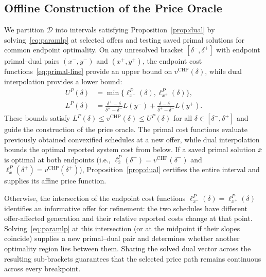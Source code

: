\documentclass[journal]{IEEEtran}
\newcommand{\CHP}{\mathrm{CHP}}
\begin{document}
\subsection{Offline Construction of the Price Oracle}
We partition $\mathcal{D}$ into intervals satisfying Proposition~\ref{prop:dual} by solving~\eqref{eq:paramlp} at selected offers and testing saved primal solutions for common endpoint optimality. On any unresolved bracket $[\delta^-,\delta^+]$ with endpoint primal--dual pairs $(x^-,y^-)$ and $(x^+,y^+)$, the endpoint cost functions~\eqref{eq:primal-line} provide an upper bound on $v^{\CHP}(\delta)$, while dual interpolation provides a lower bound:
\begin{align}
U^P(\delta) &= \min\{\ell_{x^-}^P(\delta),\ell_{x^+}^P(\delta)\},\label{eq:pricing-upper}\\
L^P(\delta) &= \frac{\delta^+-\delta}{\delta^+-\delta^-}L(y^-) + \frac{\delta-\delta^-}{\delta^+-\delta^-}L(y^+).\label{eq:pricing-lower}
\end{align}
These bounds satisfy $L^P(\delta)\le v^{\CHP}(\delta)\le U^P(\delta)$ for all $\delta\in[\delta^-,\delta^+]$ and guide the construction of the price oracle. The primal cost functions evaluate previously obtained convexified schedules at a new offer, while dual interpolation bounds the optimal reported system cost from below. If a saved primal solution $\bar{x}$ is optimal at both endpoints (i.e., $\ell_{\bar{x}}^P(\delta^-)=v^{\CHP}(\delta^-)$ and $\ell_{\bar{x}}^P(\delta^+)=v^{\CHP}(\delta^+)$), Proposition~\ref{prop:dual} certifies the entire interval and supplies its affine price function.

Otherwise, the intersection of the endpoint cost functions $\ell_{x^-}^P(\delta)=\ell_{x^+}^P(\delta)$ identifies an informative offer for refinement: the two schedules have different offer-affected generation and their relative reported costs change at that point. Solving~\eqref{eq:paramlp} at this intersection (or at the midpoint if their slopes coincide) supplies a new primal--dual pair and determines whether another optimality region lies between them. Sharing the solved dual vector across the resulting sub-brackets guarantees that the selected price path remains continuous across every breakpoint.
\end{document}
